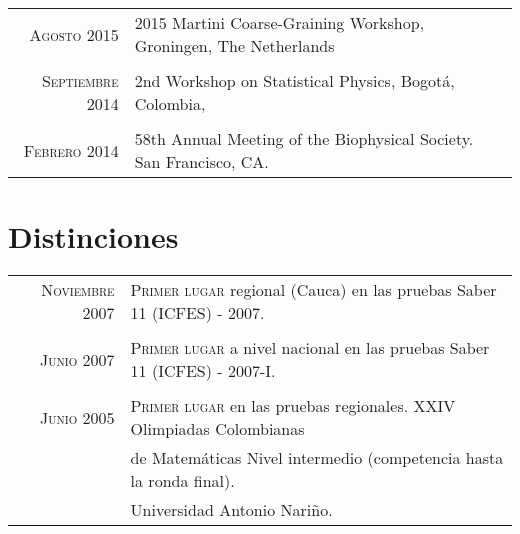 \documentclass[a4paper,10pt]{article} %
\begin{document}
\begin{tabular}{rl}

\textsc{Agosto 2015} & 2015 Martini Coarse-Graining Workshop, Groningen, The Netherlands \\
&\\

\textsc{Septiembre 2014} &  2nd Workshop on Statistical Physics, Bogotá, Colombia, \\
&\\

\textsc{Febrero 2014} &  58th Annual Meeting of the Biophysical Society. San Francisco, CA. \\

\end{tabular}



\color{OrangeRed}
\section{Distinciones}
\color{black}

\begin{tabular}{rl}

\textsc{Noviembre} 2007 & \textsc{Primer lugar} regional (Cauca) en las pruebas Saber 11 (ICFES) - 2007. \\ 
&\\

\textsc{Junio} 2007 & \textsc{Primer lugar} a nivel nacional en las pruebas Saber 11 (ICFES) - 2007-I. \\ 
&\\

\textsc{Junio} 2005 & \textsc{Primer lugar} en las pruebas regionales. XXIV Olimpiadas Colombianas  \\& de Matemáticas Nivel intermedio (competencia hasta la ronda final).  \\& Universidad Antonio Nariño.\\

\end{tabular}
\end{document}
